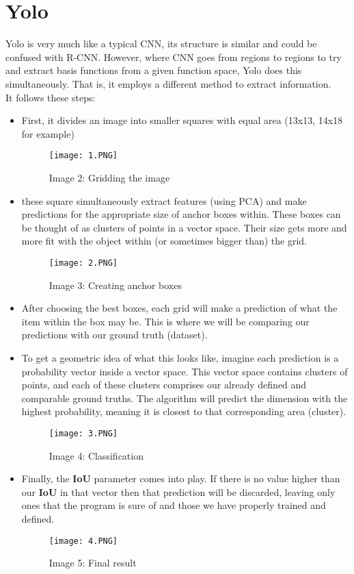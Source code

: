 \documentclass{article}
\begin{document}
\section{Yolo}
\tab Yolo is very much like a typical CNN, its structure is similar and could be confused with R-CNN. However, where CNN goes from regions to regions to try and extract basis functions from a given function space, Yolo does this simultaneously. That is, it employs a different method to extract information.\\
It follows these steps:
\begin{itemize}
	\item First, it divides an image into smaller squares with equal area (13x13, 14x18 for example)
	\begin{figure}[h]
		\centerline{\texttt{[image: 1.PNG]}}
		\caption*{Image 2: Gridding the image}
	\end{figure}
	\item these square simultaneously extract features (using PCA) and make predictions for the appropriate size of anchor boxes within. These boxes can be thought of as clusters of points in a vector space. Their size gets more and more fit with the object within (or sometimes bigger than) the grid.
	\begin{figure}[h]
		\centerline{\texttt{[image: 2.PNG]}}
		\caption*{Image 3: Creating anchor boxes}
	\end{figure}
	\item After choosing the best boxes, each grid will make a prediction of what the item within the box may be. This is where we will be comparing our predictions with our ground truth (dataset).
	\item To get a geometric idea of what this looks like, imagine each prediction is a probability vector inside a vector space. This vector space contains clusters of points, and each of these clusters comprises our already defined and comparable ground truths. The algorithm will predict the dimension with the highest probability, meaning it is closest to that corresponding area (cluster).
	\begin{figure}[h]
		\centerline{\texttt{[image: 3.PNG]}}
		\caption*{Image 4: Classification}
	\end{figure}	 
	\item Finally, the \textbf{IoU} parameter comes into play. If there is no value higher than our \textbf{IoU} in that vector then that prediction will be discarded, leaving only ones that the program is sure of and those we have properly trained and defined.
	\begin{figure}[h]
		\centerline{\texttt{[image: 4.PNG]}}
		\caption*{Image 5: Final result}
	\end{figure}
\end{itemize}
\end{document}
